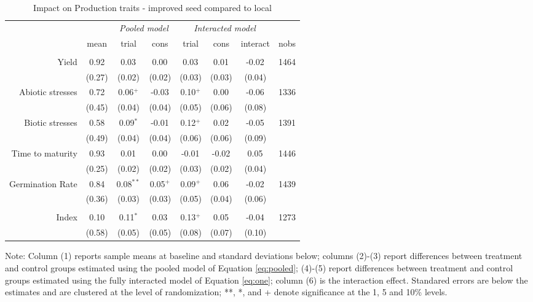 \documentclass[english]{article}\usepackage[]{graphicx}\usepackage[]{xcolor}
\begin{document}
\begin{sidewaystable}
\caption{Impact on Production traits - improved seed compared to local\label{prod_traits_compared}}

\footnotesize
\begin{center}
\begin{tabular}{rccccccc}
\hline\hline
& & \multicolumn{2}{c}{\textit{Pooled model}} & \multicolumn{3}{c}{\textit{Interacted model}} \\
& mean & trial & cons & trial & cons & interact & nobs \\
\hline
\\
Yield
& 0.92
& 0.03$^{}$
& 0.00$^{}$ 
& 0.03$^{}$ 
& 0.01$^{}$
& -0.02$^{}$ & 1464 \\

& (0.27) & (0.02)  & (0.02) & (0.03)  & (0.03)  & (0.04)
 \\

Abiotic stresses
& 0.72
& 0.06$^{+}$
& -0.03$^{}$ 
& 0.10$^{+}$ 
& 0.00$^{}$
& -0.06$^{}$ & 1336 \\

& (0.45) & (0.04)  & (0.04) & (0.05)  & (0.06)  & (0.08)
 \\

Biotic stresses
& 0.58
& 0.09$^{*}$
& -0.01$^{}$ 
& 0.12$^{+}$ 
& 0.02$^{}$
& -0.05$^{}$ & 1391 \\

& (0.49) & (0.04)  & (0.04) & (0.06)  & (0.06)  & (0.09)
 \\

Time to maturity
& 0.93
& 0.01$^{}$
& 0.00$^{}$ 
& -0.01$^{}$ 
& -0.02$^{}$
& 0.05$^{}$ & 1446 \\

& (0.25) & (0.02)  & (0.02) & (0.03)  & (0.02)  & (0.04)
 \\

Germination Rate
& 0.84
& 0.08$^{**}$
& 0.05$^{+}$ 
& 0.09$^{+}$ 
& 0.06$^{}$
& -0.02$^{}$ & 1439 \\

& (0.36) & (0.03)  & (0.03) & (0.05)  & (0.04)  & (0.06)
 \\
\\
Index
& 0.10
& 0.11$^{*}$
& 0.03$^{}$ 
& 0.13$^{+}$ 
& 0.05$^{}$
& -0.04$^{}$ & 1273 \\

& (0.58) & (0.05)  & (0.05) & (0.08)  & (0.07)  & (0.10)
 \\

\hline\hline
\end{tabular}
\end{center}
\scriptsize
Note: Column (1) reports sample means at baseline and standard deviations below;  columns (2)-(3) report differences between treatment and control groups estimated using the pooled model of Equation  \ref{eq:pooled}; (4)-(5) report differences between treatment and control groups estimated using the fully interacted model of Equation \ref{eq:one}; column (6) is the interaction effect. Standared errors are below the estimates and are clustered at the level of randomization; **, *, and + denote significance at the 1, 5 and 10\% levels.
\end{sidewaystable}
\end{document}
